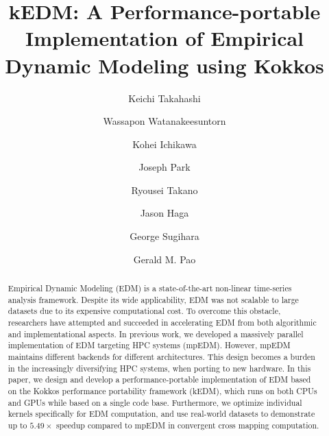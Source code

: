 \documentclass[sigconf]{acmart}
\begin{document}


\title{kEDM: A Performance-portable Implementation of Empirical Dynamic
Modeling using Kokkos}

\author{Keichi Takahashi}
\author{Wassapon Watanakeesuntorn}
\author{Kohei Ichikawa}

\author{Joseph Park}

\author{Ryousei Takano}
\author{Jason Haga}

\author{George Sugihara}

\author{Gerald M. Pao}

\renewcommand{\shortauthors}{K. Takahashi et al.}

\begin{abstract}
    Empirical Dynamic Modeling (EDM) is a state-of-the-art non-linear time-series analysis framework. Despite its wide applicability, EDM was not
    scalable to large datasets due to its expensive computational cost. To
    overcome this obstacle, researchers have attempted and succeeded in accelerating EDM from
    both algorithmic and implementational aspects. In previous work, we
     developed a massively parallel implementation of EDM targeting
    HPC systems (mpEDM). However, mpEDM maintains different backends for different
    architectures. This design becomes a burden in the
    increasingly diversifying HPC systems, when porting to new hardware. In this paper, we design
    and develop a performance-portable implementation of EDM based on
    the Kokkos performance portability framework (kEDM), which runs on both CPUs and
    GPUs while based on a single code base. Furthermore, we optimize individual kernels specifically for EDM computation, and use real-world datasets to demonstrate up to $5.49\times$ speedup compared to mpEDM
    in convergent cross mapping computation.
\end{abstract}
\end{document}
